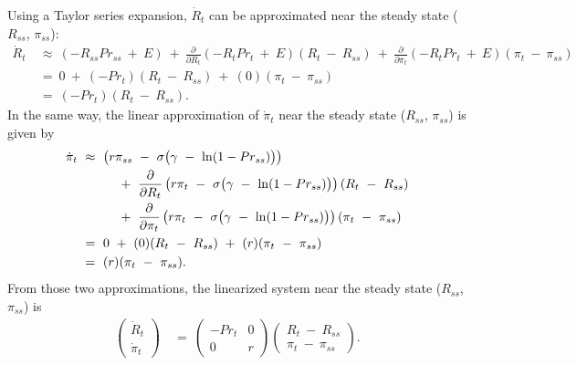 Using a Taylor series expansion, $\dot{R}_{t}$ can be approximated near the steady state ($R_{ss}$, $\pi_{ss}$):
\begin{equation*}
\begin{split}
    \dot{R}_{t} \ 
    & \approx \ (-R_{ss} Pr_{ss} \ + \ E) \ + \ \frac{\partial}{\partial R_{t}} (-R_{t} Pr_{t} \ + \ E) (R_{t} \ - \ R_{ss}) \ + \ \frac{\partial}{\partial \pi_{t}} (-R_{t} Pr_{t} \ + \ E) (\pi_{t} \ - \ \pi_{ss}) \\
    & = \ 0 \ + \ (-Pr_{t}) (R_{t} \ - \ R_{ss}) \ + \ (0) (\pi_{t} \ - \ \pi_{ss}) \\
    & = \ (-Pr_{t}) (R_{t} \ - \ R_{ss}).
\end{split}
\end{equation*}
In the same way, the linear approximation of $\dot{\pi}_{t}$ near the steady state ($R_{ss}$, $\pi_{ss}$) is given by
\begin{equation*}
\begin{split}
    \dot{\pi}_{t} \ 
    & \approx \ \left(r \pi_{ss} \ - \ \sigma \big( \gamma \ - \ \ln(1 - Pr_{ss}) \big) \right) \\
    & \hspace{1.0cm} + \ \frac{\partial}{\partial R_{t}} \left(r \pi_{t} \ - \ \sigma \big( \gamma \ - \ \ln(1 - Pr_{ss}) \big) \right) (R_{t} \ - \ R_{ss}) \\
    & \hspace{1.0cm} + \ \frac{\partial}{\partial \pi_{t}} \left(r \pi_{t} \ - \ \sigma \big( \gamma \ - \ \ln(1 - Pr_{ss}) \big) \right) (\pi_{t} \ - \ \pi_{ss}) \\
    & = \ 0 \ + \ (0) (R_{t} \ - \ R_{ss}) \ + \ (r) (\pi_{t} \ - \ \pi_{ss}) \\
    & = \ (r) (\pi_{t} \ - \ \pi_{ss}).
\end{split}
\end{equation*}
From those two approximations, the linearized system near the steady state ($R_{ss}$, $\pi_{ss}$) is
\begin{equation*}
\begin{split}
    \begin{pmatrix}
        \dot{R}_{t} \\
        \dot{\pi}_{t}
    \end{pmatrix} \ 
    & = \ 
    \begin{pmatrix}
        -Pr_{t} & 0 \\
        0 & r
    \end{pmatrix}
    \begin{pmatrix}
        R_{t} \ - \ R_{ss} \\
        \pi_{t} \ - \ \pi_{ss}
    \end{pmatrix}.
\end{split}
\end{equation*}